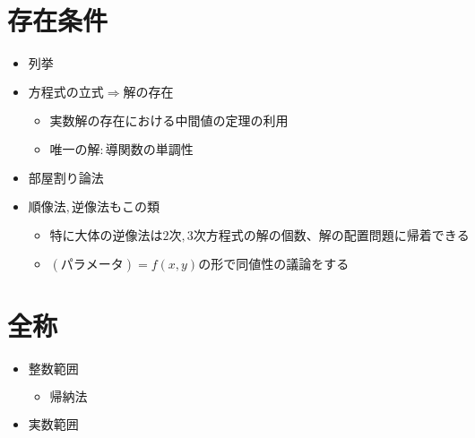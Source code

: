 \documentclass[dvipdfmx,uplatex]{jsarticle}
\begin{document}
\section{存在条件}
\begin{itemize}
	\item $ 列挙$
	\item $ 方程式の立式 \Rightarrow 解の存在$
	\begin{itemize}
		\item $ 実数解の存在における中間値の定理の利用$
		\item $ 唯一の解: 導関数の単調性$
	\end{itemize}
	\item $ 部屋割り論法$
	\item $ 順像法,逆像法もこの類$
	\begin{itemize}
		\item $ 特に大体の逆像法は2次,3次方程式の解の個数、解の配置問題に帰着できる$
		\item $ (パラメータ) = f(x,y) の形で同値性の議論をする$
	\end{itemize}
\end{itemize}

\section{全称}
\begin{itemize}
	\item $ 整数範囲$
	\begin{itemize}
		\item $ 帰納法$
	\end{itemize}
	\item $ 実数範囲$
\end{itemize}
\end{document}
